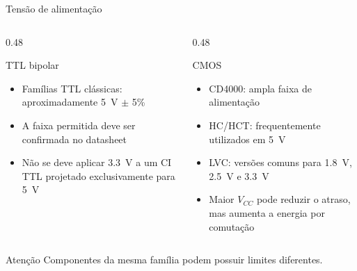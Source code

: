 
\begin{frame}{Tensão de alimentação}
    \begin{columns}[T]
        \begin{column}{0.48\textwidth}
            \begin{alertblock}{TTL bipolar}
                \begin{itemize}
                    \item Famílias TTL clássicas: aproximadamente
                          5~V $\pm$ 5\%
                    \item A faixa permitida deve ser confirmada no datasheet
                    \item Não se deve aplicar 3.3~V a um CI TTL
                          projetado exclusivamente para 5~V
                \end{itemize}
            \end{alertblock}
        \end{column}
        \begin{column}{0.48\textwidth}
            \begin{block}{CMOS}
                \begin{itemize}
                    \item CD4000: ampla faixa de alimentação
                    \item HC/HCT: frequentemente utilizados em 5~V
                    \item LVC: versões comuns para 1.8~V,
                          2.5~V e 3.3~V
                    \item Maior $V_{CC}$ pode reduzir o atraso, mas aumenta a
                          energia por comutação
                \end{itemize}
            \end{block}
        \end{column}
    \end{columns}

    \begin{alertblock}{Atenção}
        Componentes da mesma família podem possuir limites diferentes.
    \end{alertblock}
\end{frame}
